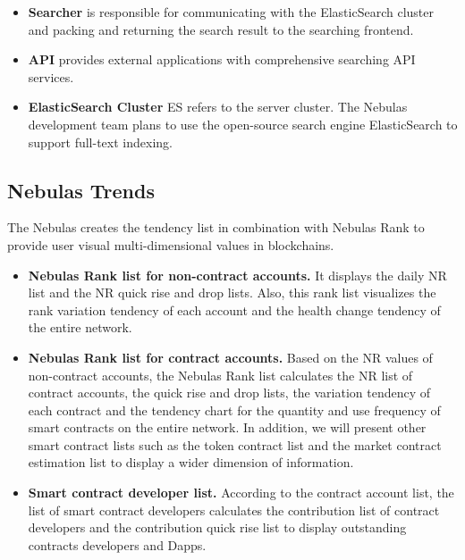 \begin{itemize}
	\item \textbf{Searcher} is responsible for communicating with the ElasticSearch cluster and packing and returning the search result to the searching frontend.

	\item \textbf{API} provides external applications with comprehensive searching API services.

	\item \textbf{ElasticSearch Cluster} ES refers to the server cluster. The Nebulas development team plans to use the open-source search engine ElasticSearch to support full-text indexing.

\end{itemize}

\subsection{Nebulas Trends}

The Nebulas creates the tendency list in combination with Nebulas Rank to provide user visual multi-dimensional values in blockchains.

\begin{itemize}
\item \textbf{Nebulas Rank list for non-contract accounts.} It displays the daily NR list and the NR quick rise and drop lists. Also, this rank list visualizes the rank variation tendency of each account and the health change tendency of the entire network.

\item \textbf{Nebulas Rank list for contract accounts.} Based on the NR values of non-contract accounts, the Nebulas Rank list calculates the NR list of contract accounts, the quick rise and drop lists, the variation tendency of each contract and the tendency chart for the quantity and use frequency of smart contracts on the entire network. In addition, we will present other smart contract lists such as the token contract list and the market contract estimation list to display a wider dimension of information.

\item \textbf{Smart contract developer list.} According to the contract account list, the list of smart contract developers calculates the contribution list of contract developers and the contribution quick rise list to display outstanding contracts developers and Dapps.

\end{itemize}

